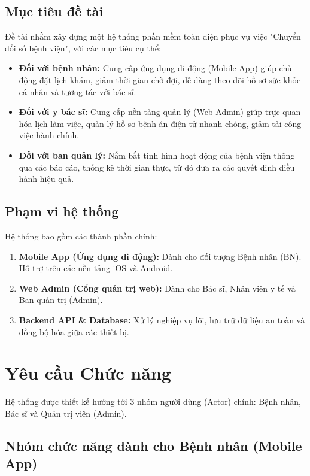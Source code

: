 \documentclass[12pt,a4paper]{article}
\begin{document}
\subsection{Mục tiêu đề tài}
Đề tài nhằm xây dựng một hệ thống phần mềm toàn diện phục vụ việc "Chuyển đổi số bệnh viện", với các mục tiêu cụ thể:
\begin{itemize}
    \item \textbf{Đối với bệnh nhân:} Cung cấp ứng dụng di động (Mobile App) giúp chủ động đặt lịch khám, giảm thời gian chờ đợi, dễ dàng theo dõi hồ sơ sức khỏe cá nhân và tương tác với bác sĩ.
    \item \textbf{Đối với y bác sĩ:} Cung cấp nền tảng quản lý (Web Admin) giúp trực quan hóa lịch làm việc, quản lý hồ sơ bệnh án điện tử nhanh chóng, giảm tải công việc hành chính.
    \item \textbf{Đối với ban quản lý:} Nắm bắt tình hình hoạt động của bệnh viện thông qua các báo cáo, thống kê thời gian thực, từ đó đưa ra các quyết định điều hành hiệu quả.
\end{itemize}

\subsection{Phạm vi hệ thống}
Hệ thống bao gồm các thành phần chính:
\begin{enumerate}
    \item \textbf{Mobile App (Ứng dụng di động):} Dành cho đối tượng Bệnh nhân (BN). Hỗ trợ trên các nền tảng iOS và Android.
    \item \textbf{Web Admin (Cổng quản trị web):} Dành cho Bác sĩ, Nhân viên y tế và Ban quản trị (Admin).
    \item \textbf{Backend API \& Database:} Xử lý nghiệp vụ lõi, lưu trữ dữ liệu an toàn và đồng bộ hóa giữa các thiết bị.
\end{enumerate}

\newpage

\section{Yêu cầu Chức năng}

Hệ thống được thiết kế hướng tới 3 nhóm người dùng (Actor) chính: Bệnh nhân, Bác sĩ và Quản trị viên (Admin).

\subsection{Nhóm chức năng dành cho Bệnh nhân (Mobile App)}
\end{document}
